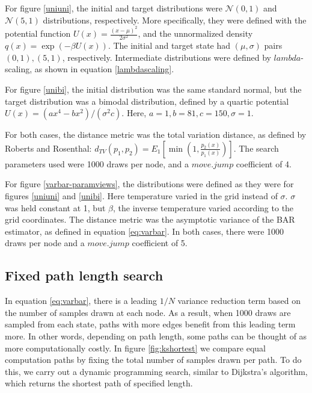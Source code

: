 For figure \ref{uniuni}, the initial and target distributions were $\mathcal{N}(0,1)$ and $\mathcal{N}(5,1)$ distributions, respectively.
More specifically, they were defined with the potential function $U(x) = \frac{(x-\mu)^2}{2\sigma^2}$, and the unnormalized density $q(x) = \exp(-\beta U(x))$.
The initial and target state had $(\mu, \sigma)$ pairs $(0,1), (5,1)$, respectively.
Intermediate distributions were defined by $lambda$-scaling, as shown in equation \eqref{lambdascaling}.

For figure \ref{unibi}, the initial distribution was the same standard normal, but the target distribution was a bimodal distribution, defined by a quartic potential $U(x) = (ax^4 - bx^2)/(\sigma^2c)$. Here, $a=1, b=81, c=150, \sigma=1$.

For both cases, the distance metric was the total variation distance, as defined by Roberts and Rosenthal\cite{roberts2004general}: $d_{TV}(p_1, p_2)=E_1 \left [\min \left (1,\frac{p_2(x)}{p_1(x)} \right ) \right ]$. 
The search parameters used were 1000 draws per node, and a $move.jump$ coefficient of 4.

For figure \ref{varbar-paramviews}, the distributions were defined as they were for figures \ref{uniuni} and \ref{unibi}. Here temperature varied in the grid instead of $\sigma$. $\sigma$ was held constant at 1, but $\beta$, the inverse temperature varied according to the grid coordinates.
The distance metric was the asymptotic variance of the BAR estimator, as defined in equation \eqref{eq:varbar}.
In both cases, there were 1000 draws per node and a $move.jump$ coefficient of 5.


\subsection{Fixed path length search} %
\label{sub:fixed_path_length_search}

In equation \eqref{eq:varbar}, there is a leading $1/N$ variance reduction term based on the number of samples drawn at each node. 
As a result, when 1000 draws are sampled from each state, paths with more edges benefit from this leading term more.
In other words, depending on path length, some paths can be thought of as more computationally costly.
In figure \ref{fig:kshortest} we compare equal computation paths by fixing the total number of samples drawn per path.
To do this, we carry out a dynamic programming search, similar to Dijkstra's algorithm, which returns the shortest path of specified length. 

